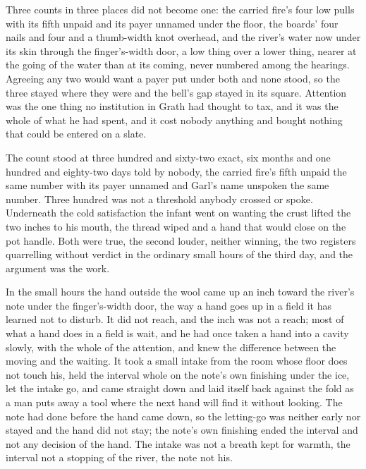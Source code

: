 Three counts in three places did not become one: the carried fire's four low pulls with its fifth unpaid and its payer unnamed under the floor, the boards' four nails and four and a thumb-width knot overhead, and the river's water now under its skin through the finger's-width door, a low thing over a lower thing, nearer at the going of the water than at its coming, never numbered among the hearings. Agreeing any two would want a payer put under both and none stood, so the three stayed where they were and the bell's gap stayed in its square. Attention was the one thing no institution in Grath had thought to tax, and it was the whole of what he had spent, and it cost nobody anything and bought nothing that could be entered on a slate.

The count stood at three hundred and sixty-two exact, six months and one hundred and eighty-two days told by nobody, the carried fire's fifth unpaid the same number with its payer unnamed and Garl's name unspoken the same number. Three hundred was not a threshold anybody crossed or spoke. Underneath the cold satisfaction the infant went on wanting the crust lifted the two inches to his mouth, the thread wiped and a hand that would close on the pot handle. Both were true, the second louder, neither winning, the two registers quarrelling without verdict in the ordinary small hours of the third day, and the argument was the work.

In the small hours the hand outside the wool came up an inch toward the river's note under the finger's-width door, the way a hand goes up in a field it has learned not to disturb. It did not reach, and the inch was not a reach; most of what a hand does in a field is wait, and he had once taken a hand into a cavity slowly, with the whole of the attention, and knew the difference between the moving and the waiting. It took a small intake from the room whose floor does not touch his, held the interval whole on the note's own finishing under the ice, let the intake go, and came straight down and laid itself back against the fold as a man puts away a tool where the next hand will find it without looking. The note had done before the hand came down, so the letting-go was neither early nor stayed and the hand did not stay; the note's own finishing ended the interval and not any decision of the hand. The intake was not a breath kept for warmth, the interval not a stopping of the river, the note not his.

